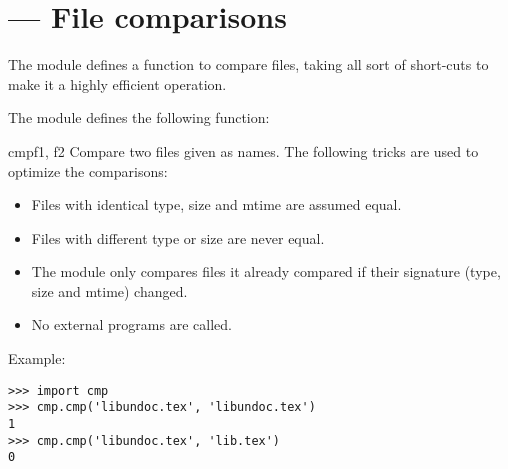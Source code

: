 \section{ ---
         File comparisons}


The  module defines a function to compare files, taking all
sort of short-cuts to make it a highly efficient operation.

The  module defines the following function:

\begin{funcdesc}{cmp}{f1, f2}
Compare two files given as names. The following tricks are used to
optimize the comparisons:

\begin{itemize}
        \item Files with identical type, size and mtime are assumed equal.
        \item Files with different type or size are never equal.
        \item The module only compares files it already compared if their
        signature (type, size and mtime) changed.
        \item No external programs are called.
\end{itemize}
\end{funcdesc}

Example:

\begin{verbatim}
>>> import cmp
>>> cmp.cmp('libundoc.tex', 'libundoc.tex')
1
>>> cmp.cmp('libundoc.tex', 'lib.tex')
0
\end{verbatim}
